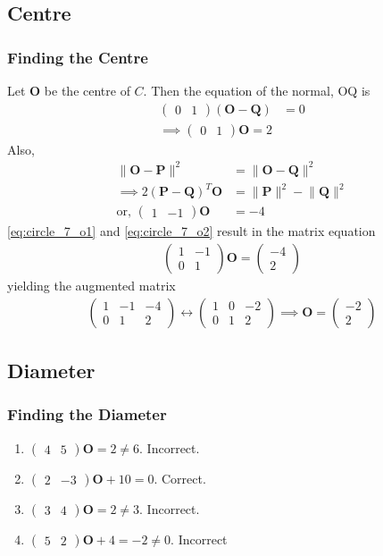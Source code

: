 \documentclass{beamer}
\providecommand{\brak}[1]{\ensuremath{\left(#1\right)}}
\theoremstyle{remark}
\providecommand{\norm}[1]{\lVert#1\rVert}
\newcommand{\myvec}[1]{\ensuremath{\begin{pmatrix}#1\end{pmatrix}}}
\let\vec\mathbf
\begin{document}
\subsection{Centre}
\begin{frame}
\frametitle{Finding the Centre}
Let $\vec{O}$ be the centre of $C$. Then the equation of the normal, OQ is
\begin{align}
\myvec{0 & 1}\brak{\vec{O}-\vec{Q}} &= 0
\nonumber \\ 
\implies \myvec{0 & 1}\vec{O} = 2
\label{eq:circle_7_o1}
\end{align}
%
Also, 
\begin{align}
\norm{\vec{O}-\vec{P}}^2&=\norm{\vec{O}-\vec{Q}}^2 
\nonumber \\
\implies 2\brak{\vec{P}-\vec{Q}}^T\vec{O} &= \norm{\vec{P}}^2-\norm{\vec{Q}}^2 
\nonumber \\
\text{or, } \myvec{1 & -1}\vec{O} &= -4
\label{eq:circle_7_o2}
\end{align}
%
\eqref{eq:circle_7_o1} and \eqref{eq:circle_7_o2} result in the matrix equation
\begin{align}
\myvec{1 & -1 \\ 0 & 1}\vec{O} = \myvec{-4\\2}
\label{eq:circle_7_matrix}
\end{align}
yielding the augmented matrix
\begin{align}
\myvec{1 & -1 & -4\\ 0 & 1 & 2} \leftrightarrow \myvec{1 & 0 & -2\\ 0 & 1 & 2}\implies \vec{O} = \myvec{-2 \\2}
\label{eq:circle_7_o}
\end{align}
%
\end{frame}
\subsection{Diameter}
\begin{frame}
\frametitle{Finding the Diameter}
\begin{enumerate}[label=(\roman*)]
\item $\myvec{4 & 5}\vec{O} = 2 \ne 6 $. Incorrect.
\vfill
\item $\myvec{2 & -3}\vec{O} +10 = 0 $. Correct.
\vfill
\item $\myvec{3 & 4}\vec{O} = 2 \ne 3 $.  Incorrect.
\vfill
\item $\myvec{5 & 2}\vec{O} +4= -2 \ne 0 $. Incorrect
\end{enumerate}
\end{frame}
\end{document}
